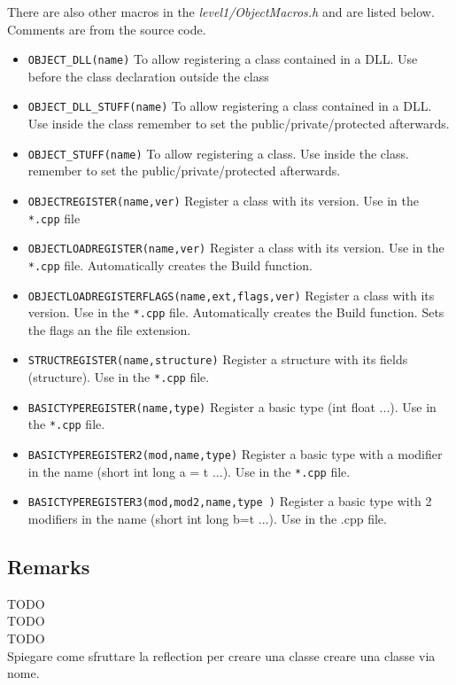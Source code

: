There are also other macros in the \textit{level1/ObjectMacros.h} and are listed below. Comments are from the source code.

\begin{itemize}
\item \texttt{OBJECT\_DLL(name)} To allow registering a class contained in a DLL. Use before the class declaration outside the class
\item \texttt{OBJECT\_DLL\_STUFF(name)} To allow registering a class contained in a DLL. Use inside the class remember to set the public/private/protected afterwards.
\item \texttt{OBJECT\_STUFF(name)} To allow registering a class. Use inside the class. remember to set the public/private/protected afterwards.

\item \texttt{OBJECTREGISTER(name,ver)} Register a class with its version. Use in the \texttt{*.cpp} file
\item \texttt{OBJECTLOADREGISTER(name,ver)} Register a class with its version. Use in the \texttt{*.cpp} file. Automatically creates the Build function.
\item \texttt{OBJECTLOADREGISTERFLAGS(name,ext,flags,ver)} Register a class with its version. Use in the \texttt{*.cpp} file. Automatically creates the Build function. Sets the flags an the file extension.

\item \texttt{STRUCTREGISTER(name,structure)} Register a structure with its fields (structure). Use in the \texttt{*.cpp} file.

\item \texttt{BASICTYPEREGISTER(name,type)} Register a basic type (int float ...). Use in the \texttt{*.cpp} file.
\item \texttt{BASICTYPEREGISTER2(mod,name,type)} Register a basic type with a modifier in the name (short int long a = t ...). Use in the \texttt{*.cpp} file.
\item \texttt{BASICTYPEREGISTER3(mod,mod2,name,type )} Register a basic type with 2 modifiers in the name (short int long b=t ...).   Use in the .cpp file.
\end{itemize}



\subsection{Remarks}
TODO \\
TODO \\
TODO \\
Spiegare come sfruttare la reflection per creare una classe creare una classe via nome.




